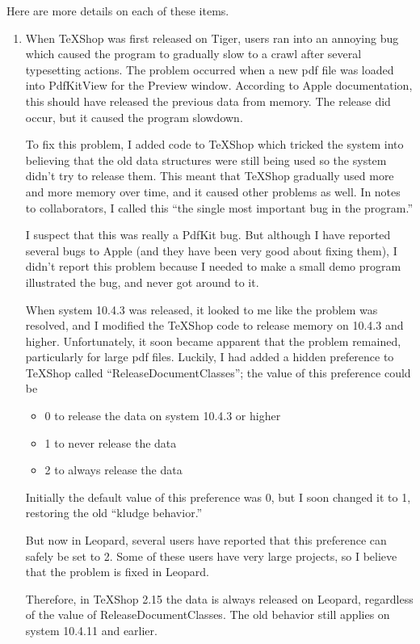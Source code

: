 \documentclass[11pt]{amsart}
\begin{document}
Here are more details on each of these items.

\begin{enumerate}
\item When TeXShop was first released on Tiger, users ran into an annoying bug which caused the program to gradually slow to a crawl after several typesetting actions. The problem occurred when a new pdf file was loaded into PdfKitView for the Preview window. According to Apple documentation, this should have released the previous data from memory. The release did occur, but it caused the program slowdown.

To fix this problem, I added code to TeXShop which tricked the system into believing that the old data structures were still being used so the system didn't try to release them. This meant that TeXShop gradually used more and more memory over time, and it caused other problems as well. In notes to collaborators, I called this ``the single most important bug in the program.'' 

I suspect that this was really a PdfKit bug. But although I have reported several bugs to Apple (and they have been very good about fixing them), I didn't report this problem because I needed to make a small demo program illustrated the bug, and never got around to it.

When system 10.4.3 was released, it looked to me like the problem was resolved, and I modified the TeXShop code to release memory on 10.4.3 and higher. Unfortunately, it soon became apparent that the problem remained, particularly for large pdf files. Luckily, I had added a hidden preference to TeXShop called ``ReleaseDocumentClasses''; the value of this preference could be 
\begin{itemize}
\item 0 to release the data on system 10.4.3 or higher
\item 1 to never release the data
\item 2 to always release the data
\end{itemize}
Initially the default value of this preference was 0, but I soon changed it to 1, restoring the old ``kludge behavior.''

But now in Leopard, several users have reported that this preference can safely be set to 2. Some of these users have very large projects, so I believe that the problem is fixed in Leopard.

Therefore, in TeXShop 2.15 the data is always released on Leopard, regardless of the value of ReleaseDocumentClasses. The old behavior still applies on system 10.4.11 and earlier.


\end{enumerate}
\end{document}
